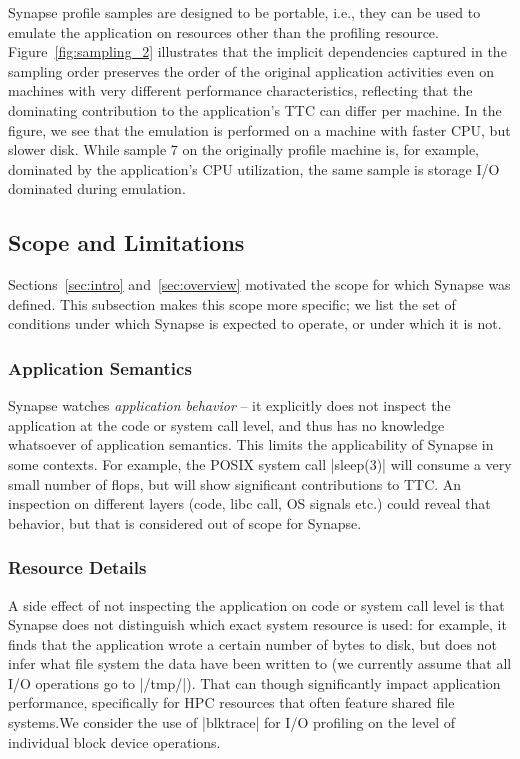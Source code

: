 \documentclass[10pt, conference, compsocconf]{IEEEtran}
\newcommand{\I}[1]{\textit{#1}\xspace}
\newcommand{\synapse}{Synapse\xspace}
\begin{document}
  \synapse profile samples are designed to be portable, i.e., they can
  be used to emulate the application on resources other than the
  profiling resource.  Figure~\ref{fig:sampling_2} illustrates that
  the implicit dependencies captured in the sampling order preserves
  the order of the original application activities even on machines
  with very different performance characteristics, reflecting that the
  dominating contribution to the application's TTC can differ per
  machine.  In the figure, we see that the emulation is performed on
  a machine with faster CPU, but slower disk.  While sample 7 on the
  originally profile machine is, for example, dominated by the
  application's CPU utilization, the same sample is storage I/O
  dominated during emulation.


 \subsection{Scope and Limitations}
 \label{sec:limits}

 Sections~\ref{sec:intro} and~\ref{sec:overview} motivated the scope
 for which \synapse was defined.  This subsection makes this scope
 more specific; we list the set of conditions under which
 \synapse is expected to operate, or under which it is not.
 

 \subsubsection{Application Semantics}  \synapse watches
 \I{application behavior} -- it explicitly does not inspect the
 application at the code or system call level, and thus has no
 knowledge whatsoever of application semantics.  This limits the
 applicability of \synapse in some contexts.  For example, the POSIX
 system call |sleep(3)| will consume a very small number of flops, but
 will show significant contributions to TTC.  An inspection on
 different layers (code, libc call, OS signals etc.) could reveal that
 behavior, but that is considered out of scope for \synapse.

 \subsubsection{Resource Details}  A side effect of not inspecting the
 application on code or system call level is that \synapse does not
 distinguish which exact system resource is used: for example, it
 finds that the application wrote a certain number of bytes to disk,
 but does not infer what file system the data have been written to (we
 currently assume that all I/O operations go to |/tmp/|).  That can
 though significantly impact application performance, specifically for
 HPC resources that often feature shared file systems.We consider the
 use of |blktrace| for I/O profiling on the level of individual block
 device operations.
\end{document}
